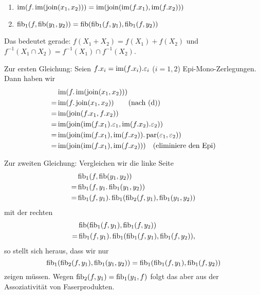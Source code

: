\begin{lemm}[Regel (f)] $\quad$ %
\begin{enumerate}
\item $\im(f.\im(\join(x_1,x_2))) = \im(\join(\im(f.x_1),\im(f.x_2)))$
\item $\fib_1(f,\fib(y_1,y_2)) = \fib(\fib_1(f,y_1),\fib_1(f,y_2))$
\end{enumerate}
Das bedeutet gerade: $f(X_1 + X_2) = f(X_1) + f(X_2)$ und $f^{-1}(X_1\cap X_2) = f^{-1}(X_1) \cap f^{-1}(X_2)$.
\end{lemm}
\begin{bew}
Zur ersten Gleichung: Seien $f.x_i = \im(f.x_i).\varepsilon_i$ ($i=1,2$) Epi-Mono-Zerlegungen.
Dann haben wir
\begin{align*}
   & \im(f.\im(\join(x_1,x_2)))
\\=& \im(f.\join(x_1,x_2)) \qquad \text{(nach (d))}
\\=& \im(\join(f.x_1,f.x_2))
\\=& \im(\join(\im(f.x_1).\varepsilon_1,\im(f.x_2).\varepsilon_2))
\\=& \im(\join(\im(f.x_1),\im(f.x_2)).\para(\varepsilon_1,\varepsilon_2))
\\=& \im(\join(\im(f.x_1),\im(f.x_2))) \quad \text{(eliminiere den Epi)}
\end{align*}

Zur zweiten Gleichung:
Vergleichen wir die linke Seite
\begin{align*}
   & \fib_1(f,\fib(y_1,y_2))
\\=& \fib_1(f,y_1.\fib_1(y_1,y_2))
\\=& \fib_1(f,y_1).\fib_1(\fib_2(f,y_1),\fib_1(y_1,y_2))
\end{align*}
mit der rechten
\begin{align*}
   & \fib(\fib_1(f,y_1),\fib_1(f,y_2))
\\=& \fib_1(f,y_1).\fib_1(\fib_1(f,y_1),\fib_1(f,y_2)),
\end{align*}
so stellt sich heraus, dass wir nur
\[ \fib_1(\fib_2(f,y_1),\fib_1(y_1,y_2)) = \fib_1(\fib_1(f,y_1),\fib_1(f,y_2)) \]
zeigen müssen. Wegen $\fib_2(f,y_1) = \fib_1(y_1,f)$ folgt das aber aus der Assoziativität von Faserprodukten.
\end{bew}


